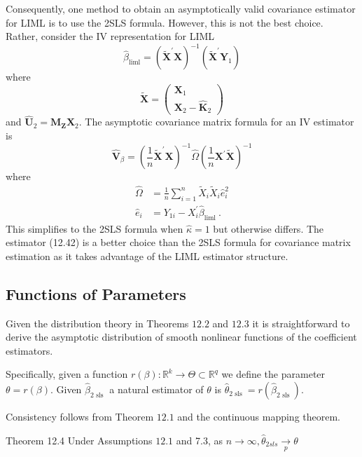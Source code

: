 \documentclass[10pt]{article}
\begin{document}
Consequently, one method to obtain an asymptotically valid covariance estimator for LIML is to use the 2SLS formula. However, this is not the best choice. Rather, consider the IV representation for LIML
$$
\widehat{\beta}_{\mathrm{liml}}=\left(\widetilde{\boldsymbol{X}}^{\prime} \boldsymbol{X}\right)^{-1}\left(\widetilde{\boldsymbol{X}}^{\prime} \boldsymbol{Y}_{1}\right)
$$
where
$$
\widetilde{\boldsymbol{X}}=\left(\begin{array}{c}
\boldsymbol{X}_{1} \\
\boldsymbol{X}_{2}-\widehat{\boldsymbol{K}}_{2}
\end{array}\right)
$$
and $\widehat{\boldsymbol{U}}_{2}=\boldsymbol{M}_{\boldsymbol{Z}} \boldsymbol{X}_{2}$. The asymptotic covariance matrix formula for an IV estimator is
$$
\widehat{\boldsymbol{V}}_{\beta}=\left(\frac{1}{n} \widetilde{\boldsymbol{X}}^{\prime} \boldsymbol{X}\right)^{-1} \widehat{\Omega}\left(\frac{1}{n} \boldsymbol{X}^{\prime} \tilde{\boldsymbol{X}}\right)^{-1}
$$
where
$$
\begin{aligned}
\widehat{\Omega} &=\frac{1}{n} \sum_{i=1}^{n} \widetilde{X}_{i} \widetilde{X}_{i} \widehat{e}_{i}^{2} \\
\widehat{e}_{i} &=Y_{1 i}-X_{i}^{\prime} \widehat{\beta}_{\text {liml }} .
\end{aligned}
$$
This simplifies to the 2SLS formula when $\widehat{\kappa}=1$ but otherwise differs. The estimator (12.42) is a better choice than the 2SLS formula for covariance matrix estimation as it takes advantage of the LIML estimator structure.

\subsection{Functions of Parameters}
Given the distribution theory in Theorems $12.2$ and $12.3$ it is straightforward to derive the asymptotic distribution of smooth nonlinear functions of the coefficient estimators.

Specifically, given a function $r(\beta): \mathbb{R}^{k} \rightarrow \Theta \subset \mathbb{R}^{q}$ we define the parameter $\theta=r(\beta)$. Given $\widehat{\beta}_{2 \text { sls }}$ a natural estimator of $\theta$ is $\widehat{\theta}_{2 \text { sls }}=r\left(\widehat{\beta}_{2 \text { sls }}\right)$.

Consistency follows from Theorem $12.1$ and the continuous mapping theorem.

Theorem 12.4 Under Assumptions $12.1$ and 7.3, as $n \rightarrow \infty, \widehat{\theta}_{2 s l s} \underset{p}{\longrightarrow} \theta$
\end{document}
